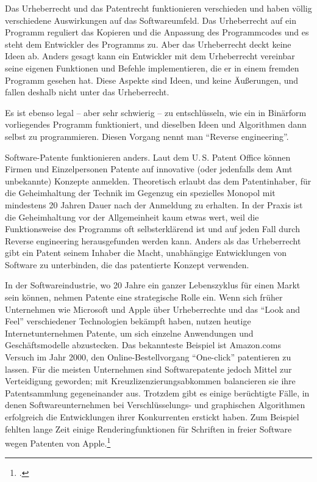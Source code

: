 Das Urheberrecht und das Patentrecht funktionieren verschieden und haben völlig verschiedene Auswirkungen auf das Softwareumfeld. Das Urheberrecht auf ein Programm reguliert das Kopieren und die Anpassung des Programmcodes und es steht dem Entwickler des Programms zu. Aber das Urheberrecht deckt keine Ideen ab. Anders gesagt kann ein Entwickler mit dem Urheberrecht vereinbar seine eigenen Funktionen und Befehle implementieren, die er in einem fremden Programm gesehen hat. Diese Aspekte sind Ideen, und keine Äußerungen, und fallen deshalb nicht unter das Urheberrecht.

Es ist ebenso legal – aber sehr schwierig – zu entschlüsseln, wie ein in Binärform vorliegendes Programm funktioniert, und dieselben Ideen und Algorithmen dann selbst zu programmieren. Diesen Vorgang nennt man "`Reverse engineering"'.

Software-Patente funktionieren anders. Laut dem U.\,S. Patent Office können Firmen und Einzelpersonen Patente auf innovative (oder jedenfalls dem Amt unbekannte) Konzepte anmelden. Theoretisch erlaubt das dem Patentinhaber, für die Geheimhaltung der Technik im Gegenzug ein spezielles Monopol mit mindestens 20 Jahren Dauer nach der Anmeldung zu erhalten. In der Praxis ist die Geheimhaltung vor der Allgemeinheit kaum etwas wert, weil die Funktionsweise des Programms oft selbsterklärend ist und auf jeden Fall durch Reverse engineering herausgefunden werden kann. Anders als das Urheberrecht gibt ein Patent seinem Inhaber die Macht, unabhängige Entwicklungen von Software zu unterbinden, die das patentierte Konzept verwenden.

In der Softwareindustrie, wo 20 Jahre ein ganzer Lebenszyklus für einen Markt sein können, nehmen Patente eine strategische Rolle ein. Wenn sich früher Unternehmen wie Microsoft und Apple über Urheberrechte und das "`Look and Feel"' verschiedener Technologien bekämpft haben, nutzen heutige Internetunternehmen Patente, um sich einzelne Anwendungen und Geschäftsmodelle abzustecken. Das bekannteste Beispiel ist Amazon.coms Versuch im Jahr 2000, den Online-Bestellvorgang  "`One-click"' patentieren zu lassen. Für die meisten Unternehmen sind Softwarepatente jedoch Mittel zur Verteidigung geworden; mit Kreuzlizenzierungsabkommen balancieren sie ihre Patentsammlung gegeneinander aus. Trotzdem gibt es einige berüchtigte Fälle, in denen Softwareunternehmen bei Verschlüsselungs- und graphischen Algorithmen erfolgreich die Entwicklungen ihrer Konkurrenten erstickt haben. Zum Beispiel fehlten lange Zeit einige Renderingfunktionen für Schriften in freier Software wegen Patenten von Apple.\footcite[Vgl.][]{freetypepat}

